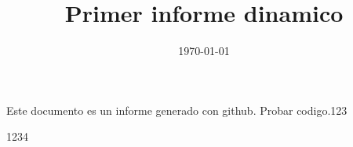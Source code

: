 \documentclass[12pt,a4paper]{book}
\title{Primer informe dinamico}
\author{}
\date{\today}
\begin{document}
\maketitle

Este documento es un informe generado con github.
Probar codigo.123

1234
\end{document}
